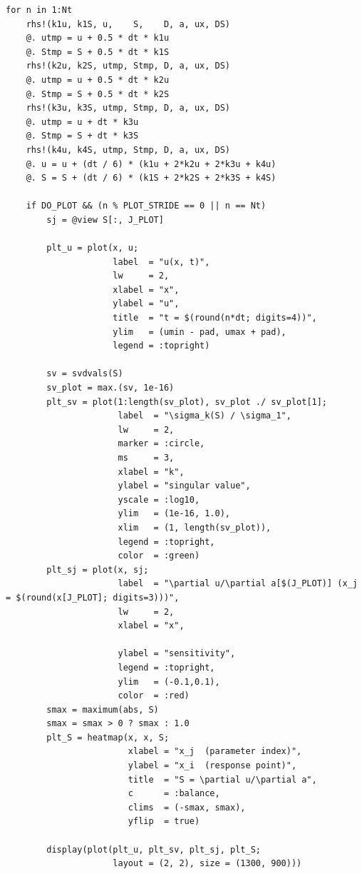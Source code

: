 \documentclass[11pt]{article}
\begin{document}
\begin{verbatim}
for n in 1:Nt
    rhs!(k1u, k1S, u,    S,    D, a, ux, DS)
    @. utmp = u + 0.5 * dt * k1u
    @. Stmp = S + 0.5 * dt * k1S
    rhs!(k2u, k2S, utmp, Stmp, D, a, ux, DS)
    @. utmp = u + 0.5 * dt * k2u
    @. Stmp = S + 0.5 * dt * k2S
    rhs!(k3u, k3S, utmp, Stmp, D, a, ux, DS)
    @. utmp = u + dt * k3u
    @. Stmp = S + dt * k3S
    rhs!(k4u, k4S, utmp, Stmp, D, a, ux, DS)
    @. u = u + (dt / 6) * (k1u + 2*k2u + 2*k3u + k4u)
    @. S = S + (dt / 6) * (k1S + 2*k2S + 2*k3S + k4S)

    if DO_PLOT && (n % PLOT_STRIDE == 0 || n == Nt)
        sj = @view S[:, J_PLOT]

        plt_u = plot(x, u;
                     label  = "u(x, t)",
                     lw     = 2,
                     xlabel = "x",
                     ylabel = "u",
                     title  = "t = $(round(n*dt; digits=4))",
                     ylim   = (umin - pad, umax + pad),
                     legend = :topright)
    
        sv = svdvals(S)
        sv_plot = max.(sv, 1e-16)
        plt_sv = plot(1:length(sv_plot), sv_plot ./ sv_plot[1];
                      label  = "\sigma_k(S) / \sigma_1",
                      lw     = 2,
                      marker = :circle,
                      ms     = 3,
                      xlabel = "k",
                      ylabel = "singular value",
                      yscale = :log10,
                      ylim   = (1e-16, 1.0),
                      xlim   = (1, length(sv_plot)),
                      legend = :topright,
                      color  = :green)
        plt_sj = plot(x, sj;
                      label  = "\partial u/\partial a[$(J_PLOT)] (x_j = $(round(x[J_PLOT]; digits=3)))",
                      lw     = 2,
                      xlabel = "x",

                      ylabel = "sensitivity",
                      legend = :topright,
                      ylim   = (-0.1,0.1),
                      color  = :red)
        smax = maximum(abs, S)
        smax = smax > 0 ? smax : 1.0
        plt_S = heatmap(x, x, S;
                        xlabel = "x_j  (parameter index)",
                        ylabel = "x_i  (response point)",
                        title  = "S = \partial u/\partial a",
                        c      = :balance,
                        clims  = (-smax, smax),
                        yflip  = true)

        display(plot(plt_u, plt_sv, plt_sj, plt_S;
                     layout = (2, 2), size = (1300, 900)))


\end{verbatim}
\end{document}
